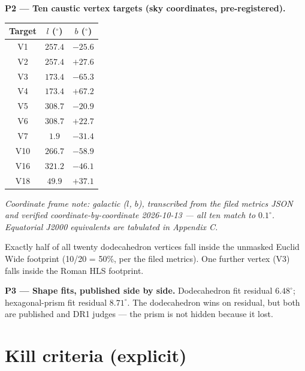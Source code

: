 \documentclass{alienfolio}
\begin{document}
\textbf{P2 --- Ten caustic vertex targets (sky coordinates,
pre-registered).}

\begin{center}
\begin{tabular}{c|c|c}
Target & $l$ ($^\circ$) & $b$ ($^\circ$) \\ \hline
V1 & $257.4$ & $-25.6$ \\
V2 & $257.4$ & $+27.6$ \\
V3 & $173.4$ & $-65.3$ \\
V4 & $173.4$ & $+67.2$ \\
V5 & $308.7$ & $-20.9$ \\
V6 & $308.7$ & $+22.7$ \\
V7 & $1.9$ & $-31.4$ \\
V10 & $266.7$ & $-58.9$ \\
V16 & $321.2$ & $-46.1$ \\
V18 & $49.9$ & $+37.1$ \\
\end{tabular}
\end{center}

\emph{Coordinate frame note: galactic ($l$, $b$), transcribed from the
filed metrics JSON and verified coordinate-by-coordinate 2026-10-13 ---
all ten match to $0.1^\circ$. Equatorial J2000 equivalents are tabulated
in Appendix C.}

Exactly half of all twenty dodecahedron vertices fall inside the
unmasked Euclid Wide footprint (10/20 = 50\%, per the filed metrics).
One further vertex (V3) falls inside the Roman HLS footprint.

\textbf{P3 --- Shape fits, published side by side.} Dodecahedron fit
residual $\mathbf{6.48^\circ}$; hexagonal-prism fit residual
$\mathbf{8.71^\circ}$. The dodecahedron wins on residual, but both are
published and DR1 judges --- the prism is not hidden because it lost.

\section{Kill criteria (explicit)}
\label{sec:kills}
\end{document}
